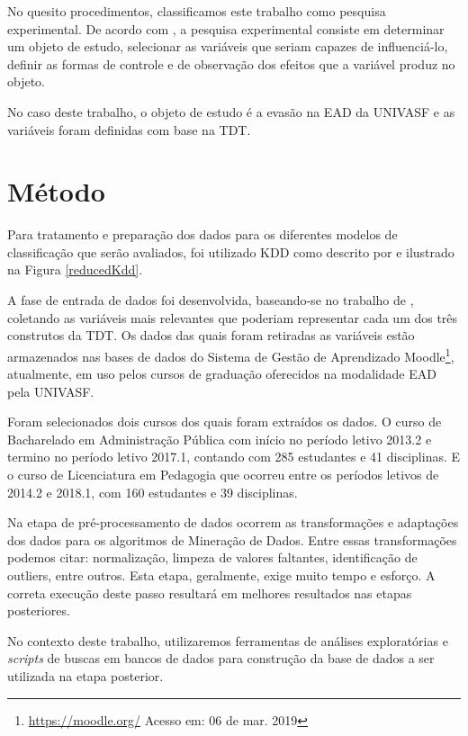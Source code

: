 No quesito procedimentos, classificamos este trabalho como pesquisa
experimental. De acordo com , a pesquisa
experimental consiste em determinar um objeto de estudo, selecionar as variáveis
que seriam capazes de influenciá-lo, definir as formas de controle e de
observação dos efeitos que a variável produz no objeto.

No caso deste trabalho, o objeto de estudo é a evasão na EAD da UNIVASF e as
variáveis foram definidas com base na TDT.

\section{Método}

Para tratamento e preparação dos dados para os diferentes modelos de
classificação que serão avaliados, foi utilizado KDD como descrito por
 e ilustrado na Figura \ref{reducedKdd}.


A fase de entrada de dados foi desenvolvida, baseando-se no trabalho de
, coletando as variáveis mais relevantes que
poderiam representar cada um dos três construtos da TDT. Os dados das quais
foram retiradas as variáveis estão armazenados nas bases de dados do Sistema de
Gestão de Aprendizado Moodle\footnote{\url{https://moodle.org/} Acesso em: 06 de
mar. 2019}, atualmente, em uso pelos cursos de graduação oferecidos na
modalidade EAD pela UNIVASF.

Foram selecionados dois cursos dos quais foram extraídos os dados. O curso de
Bacharelado em Administração Pública com início no período letivo 2013.2 e
termino no período letivo 2017.1, contando com 285 estudantes e 41 disciplinas.
E o curso de Licenciatura em Pedagogia que ocorreu entre os períodos letivos de
2014.2 e 2018.1, com 160 estudantes e 39 disciplinas.

Na etapa de pré-processamento de dados ocorrem as transformações e adaptações
dos dados para os algoritmos de Mineração de Dados. Entre essas transformações
podemos citar: normalização, limpeza de valores faltantes, identificação de
outliers, entre outros. Esta etapa, geralmente, exige muito tempo e esforço. A
correta execução deste passo resultará em melhores resultados nas etapas
posteriores.

No contexto deste trabalho, utilizaremos ferramentas de análises exploratórias e
\textit{scripts} de buscas em bancos de dados para construção da base de dados a
ser utilizada na etapa posterior.

